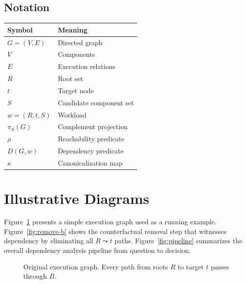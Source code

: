 \documentclass[11pt]{article}
\begin{document}
\subsection*{Notation}
\begin{center}
\begin{tabular}{@{}ll@{}}
\toprule
\textbf{Symbol} & \textbf{Meaning} \\
\midrule
$G=(V,E)$ & Directed graph \\
$V$ & Components \\
$E$ & Execution relations \\
$R$ & Root set \\
$t$ & Target node \\
$S$ & Candidate component set \\
$w=(R,t,S)$ & Workload \\
$\pi_S(G)$ & Complement projection \\
$\rho$ & Reachability predicate \\
$D(G,w)$ & Dependency predicate \\
$\kappa$ & Canonicalization map \\
\bottomrule
\end{tabular}
\end{center}

\section{Illustrative Diagrams}

Figure~\ref{fig:original-graph} presents a simple execution graph used as a running example. Figure~\ref{fig:remove-b} shows the counterfactual removal step that witnesses dependency by eliminating all $R\leadsto t$ paths. Figure~\ref{fig:pipeline} summarizes the overall dependency analysis pipeline from question to decision.

\begin{figure}[t]
\centering
{}
\caption{Original execution graph. Every path from roots $R$ to target $t$ passes through $B$.}
\label{fig:original-graph}
\end{figure}
\end{document}
